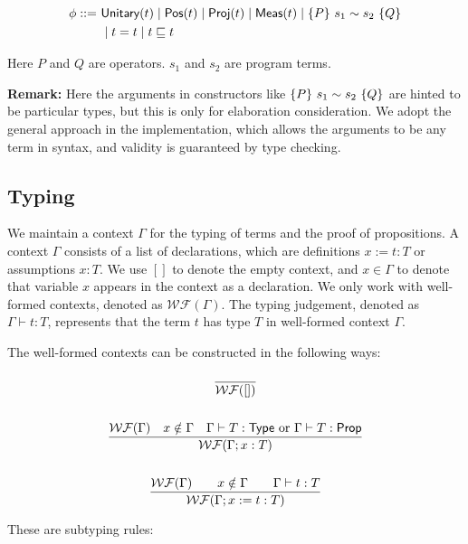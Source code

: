 \begin{definition}
    \label{def:prop syntax}
    \begin{align*}
        \phi ::=\ & \textsf{Unitary}({t}) \mid \textsf{Pos}({t}) \mid \textsf{Proj}({t}) \mid \textsf{Meas}(t) \mid \{P\}~s_1 \sim s_2~\{Q\} \\
                & \mid t = t \mid t \sqsubseteq t
    \end{align*}
\end{definition}
Here $P$ and $Q$ are operators. $s_1$ and $s_2$ are program terms.

\textbf{Remark:} Here the arguments in constructors like $\{P\}~s_1 \sim s_2~\{Q\}$ are hinted to be particular types, but this is only for elaboration consideration. We adopt the general approach in the implementation, which allows the arguments to be any term in syntax, and validity is guaranteed by type checking.


\subsection{Typing}

\newcommand{\WF}[1]{\ensuremath{\mathcal{WF}(#1)}}

We maintain a context $\Gamma$ for the typing of terms and the proof of propositions. 
A context $\Gamma$ consists of a list of declarations, which are definitions $x := t : T$ or assumptions $x : T$. 
We use $[]$ to denote the empty context, and $x \in \Gamma$ to denote that variable $x$ appears in the context as a declaration.
We only work with well-formed contexts, denoted as \WF{\Gamma}. 
The typing judgement, denoted as $\Gamma \vdash t : T$, represents that the term $t$ has type $T$ in well-formed context $\Gamma$. 


The well-formed contexts can be constructed in the following ways:

\begin{gather*}
    \frac{}{\WF{[]}} \\
    \\
    \frac{\WF{\Gamma} \quad x \notin \Gamma \quad \Gamma \vdash T : \Type \text{ or } \Gamma \vdash T : \prop}{\WF{\Gamma;x:T}} \\
    \\
    \frac{\WF{\Gamma} \qquad x \notin \Gamma \qquad \Gamma \vdash t : T}{\WF{\Gamma;x := t : T}} \\
\end{gather*}

These are subtyping rules:
\begin{gather*}
\end{gather*}


